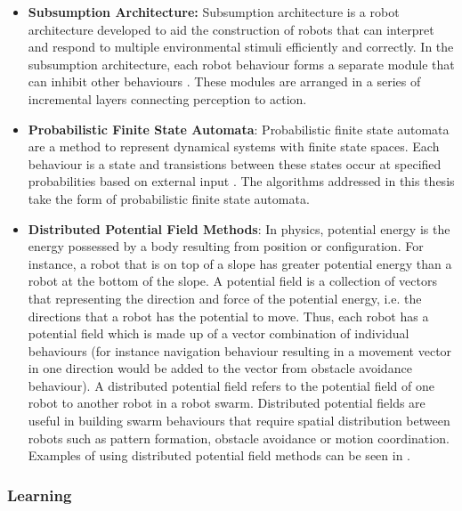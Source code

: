 \begin{itemize}
	\item \textbf{Subsumption Architecture:} Subsumption architecture is a robot architecture developed to aid the construction of robots that can interpret and respond to multiple environmental stimuli efficiently and correctly. In the subsumption architecture, each robot behaviour forms a separate module that can inhibit other behaviours \cite{connell1989colony}. These modules are arranged in a series of incremental layers connecting perception to action. 
	
	\item \textbf{Probabilistic Finite State Automata}: Probabilistic finite state automata are a method to represent dynamical systems with finite state spaces. Each behaviour is a state and transistions between these states occur at specified probabilities based on external input \cite{labella2004efficiency, soysal2005probabilistic}. The algorithms addressed in this thesis take the form of probabilistic finite state automata.  
	
	\item \textbf{Distributed Potential Field Methods}: In physics, potential energy is the energy possessed by a body resulting from position or configuration. For instance, a robot that is on top of a slope has greater potential energy than a robot at the bottom of the slope. A potential field is a collection of vectors that representing the direction and force of the potential energy, i.e. the directions that a robot has the potential to move. Thus, each robot has a potential field which is made up of a vector combination of individual behaviours (for instance navigation behaviour resulting in a movement vector in one direction would be added to the vector from obstacle avoidance behaviour). A distributed potential field refers to the potential field of one robot to another robot in a robot swarm. Distributed potential fields are useful in building swarm behaviours that require spatial distribution between robots such as pattern formation, obstacle avoidance or motion coordination. Examples of using distributed potential field methods can be seen in \cite{bennet2010distributed, barnes2007unmanned, kim2006decentralized}.
\end{itemize}

\subsubsection{Learning}

